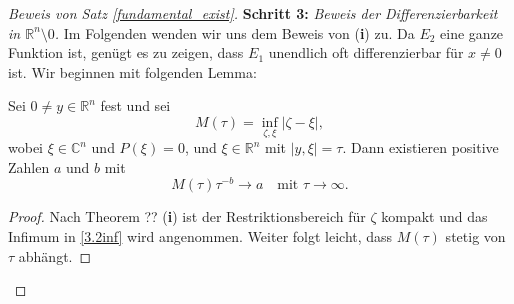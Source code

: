 \begin{proof}[Beweis von Satz \ref{fundamental_exist}]
\textbf{Schritt 3:} \emph{Beweis der Differenzierbarkeit in $\mathbb R^n\setminus{0}$.}
Im Folgenden wenden wir uns dem Beweis von ({\bf i}) zu. Da $E_2$ eine ganze Funktion ist, genügt es zu zeigen, dass $E_1$ unendlich oft differenzierbar für $x\neq 0$ ist.  Wir beginnen mit folgenden Lemma:
\begin{lem}\label{3.2lem1}
Sei $0\neq y \in \mathbb R^n$ fest und sei
\begin{equation}\label{3.2inf}
M(\tau) = \inf_{\zeta, \xi} |\zeta-\xi|,
\end{equation}
wobei $\xi\in \mathbb C^n$ und $P(\xi)=0$, und $\xi\in \mathbb R^n$ mit $|y, \xi|= \tau$. Dann existieren positive Zahlen $a$ und $b$ mit
\begin{equation}\label{3.2to}
M(\tau) \tau^{-b} \to a\quad \text{mit } \tau \to \infty.
\end{equation}
\end{lem}
\begin{proof}
Nach Theorem ?? ({\bf i}) ist der Restriktionsbereich für $\zeta$ kompakt und das Infimum in \ref{3.2inf} wird angenommen. Weiter folgt leicht, dass $M(\tau)$ stetig von $\tau$ abhängt.
\end{proof}
  




\end{proof}
